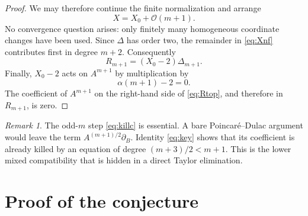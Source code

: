 \documentclass[11pt]{article}
\theoremstyle{remark}
\newtheorem{remark}[theorem]{Remark}
\newcommand{\cO}{\mathcal O}
\begin{document}
\begin{proof}
We may therefore continue the finite normalization and arrange
\begin{equation}
                              X=X_0+\cO(m+1).                         \label{eq:Xnf}
\end{equation}
No convergence question arises: only finitely many homogeneous coordinate
changes have been used.  Since \(\Delta\) has order two, the remainder in
\eqref{eq:Xnf} contributes first in degree \(m+2\).  Consequently
\begin{equation}
                         R_{m+1}=(X_0-2)\Delta_{m+1}.                 \label{eq:Rtop}
\end{equation}
Finally, \(X_0-2\) acts on \(A^{m+1}\) by multiplication by
\[
                         \alpha(m+1)-2=0.
\]
The coefficient of \(A^{m+1}\) on the right-hand side of
\eqref{eq:Rtop}, and therefore in \(R_{m+1}\), is zero.
\end{proof}

\begin{remark}
The odd-\(m\) step \eqref{eq:killc} is essential.  A bare
Poincar\'e--Dulac argument would leave the term \(A^{(m+1)/2}\partial_B\).
Identity \eqref{eq:key} shows that its coefficient is already killed by an
equation of degree \((m+3)/2<m+1\).  This is the lower mixed compatibility
that is hidden in a direct Taylor elimination.
\end{remark}

\section{Proof of the conjecture}                                  \label{sec:proof}
\end{document}
